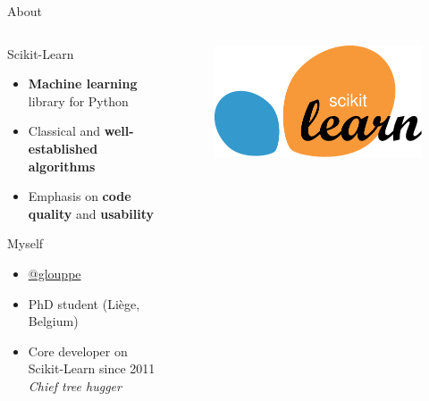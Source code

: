 \documentclass{beamer}
\begin{document}
\begin{frame}{About}


\begin{columns}
\begin{column}[t]{0.7\textwidth}
\begin{block}{Scikit-Learn}
\begin{itemize}
    \item {\bf Machine learning} library for Python
    \item Classical and {\bf well-established algorithms}
    \item Emphasis on {\bf code quality} and {\bf usability}
\end{itemize}
\end{block}
\begin{block}{Myself}
    \begin{itemize}
      \item \href{https://twitter.com/glouppe}{@glouppe}
      \item PhD student (Liège, Belgium)
      \item Core developer on Scikit-Learn since 2011\\
        \textit{Chief tree hugger}
    \end{itemize}
\end{block}
\end{column}
\begin{column}[t]{0.3\textwidth}
    \begin{figure}
    \includegraphics[scale=0.4]{./figures/scikit-learn-logo.pdf}
    \end{figure}
\end{column}
\end{columns}

\end{frame}
\end{document}

